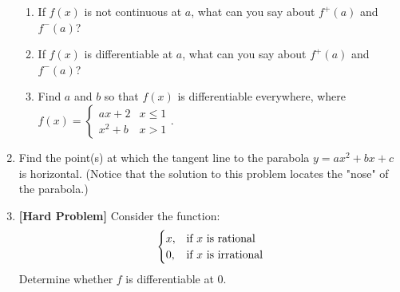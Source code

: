 \documentclass[12pt]{article}
\begin{document}
\begin{enumerate}
\begin{enumerate}
		\item If $f(x)$ is not continuous at $a$, what can you say about $f^+(a)$ and $f^-(a)$?
		
		\vskip 2cm 
		
		\item If $f(x)$ is differentiable at $a$, what can you say about $f^+(a)$ and $f^-(a)$?
		
		\vskip 2cm
		
		\item Find $a$ and $b$ so that $f(x)$ is differentiable everywhere, where $f(x) = \begin{cases} ax+2 & x \leq 1 \\ x^2+b & x>1 \end{cases}$.
		
		\vskip2cm
		\end{enumerate}
	
		\item Find the point(s) at which the tangent line to the parabola $y = ax^2 + bx + c$ is horizontal. (Notice that the solution to this problem locates the "nose" of the parabola.)
		\vskip 6cm
		\item \textbf{[Hard Problem]} Consider the function:
		$$\begin{cases}
			x, & \textnormal{if $x$ is rational}\\ 0, & \textnormal{if $x$ is irrational} 
		\end{cases}$$
		Determine whether $f$ is differentiable at $0$. 
\end{enumerate}
\end{document}
